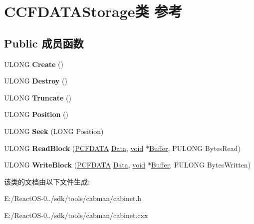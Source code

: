 \hypertarget{class_c_c_f_d_a_t_a_storage}{}\section{C\+C\+F\+D\+A\+T\+A\+Storage类 参考}
\label{class_c_c_f_d_a_t_a_storage}
\subsection*{Public 成员函数}
\begin{DoxyCompactItemize}
\item 
\mbox{\label{class_c_c_f_d_a_t_a_storage_a0663b30e5912aab4941af1d6d5b9e07c}} 
U\+L\+O\+NG {\bfseries Create} ()
\item 
\mbox{\label{class_c_c_f_d_a_t_a_storage_a0cb859f8c1d8802dcb25e476715938d9}} 
U\+L\+O\+NG {\bfseries Destroy} ()
\item 
\mbox{\label{class_c_c_f_d_a_t_a_storage_a7a4ab988ec69d4ca094ae828959bf8ca}} 
U\+L\+O\+NG {\bfseries Truncate} ()
\item 
\mbox{\label{class_c_c_f_d_a_t_a_storage_ae6a9015a740bb63a32880fa8c69ed7a5}} 
U\+L\+O\+NG {\bfseries Position} ()
\item 
\mbox{\label{class_c_c_f_d_a_t_a_storage_a94826ee70a440f2ae3c6801fe88353f8}} 
U\+L\+O\+NG {\bfseries Seek} (L\+O\+NG Position)
\item 
\mbox{\label{class_c_c_f_d_a_t_a_storage_a22012d3911b9ce74796abb55efeec8f2}} 
U\+L\+O\+NG {\bfseries Read\+Block} (\hyperlink{struct___c_f_d_a_t_a}{P\+C\+F\+D\+A\+TA} \hyperlink{struct_data}{Data}, \hyperlink{interfacevoid}{void} $\ast$\hyperlink{class_buffer}{Buffer}, P\+U\+L\+O\+NG Bytes\+Read)
\item 
\mbox{\label{class_c_c_f_d_a_t_a_storage_ac4e8b2bb767c240e5c7c123b0c169538}} 
U\+L\+O\+NG {\bfseries Write\+Block} (\hyperlink{struct___c_f_d_a_t_a}{P\+C\+F\+D\+A\+TA} \hyperlink{struct_data}{Data}, \hyperlink{interfacevoid}{void} $\ast$\hyperlink{class_buffer}{Buffer}, P\+U\+L\+O\+NG Bytes\+Written)
\end{DoxyCompactItemize}


该类的文档由以下文件生成\+:\begin{DoxyCompactItemize}
\item 
E\+:/\+React\+O\+S-\/0../sdk/tools/cabman/cabinet.\+h\item 
E\+:/\+React\+O\+S-\/0../sdk/tools/cabman/cabinet.\+cxx\end{DoxyCompactItemize}
